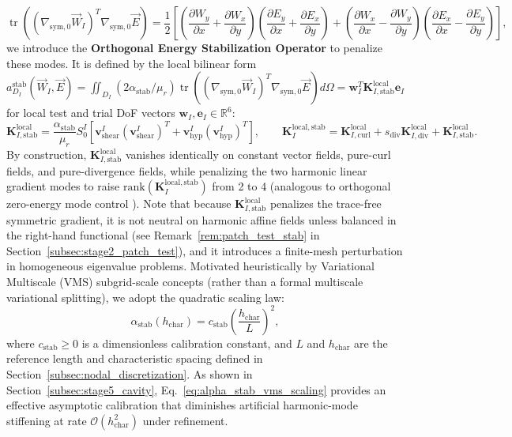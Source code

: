 \documentclass[VANCOUVER,Times1COL]{WileyNJD-v5}
\begin{document}
\begin{equation}
    \operatorname{tr}\!\left((\nabla_{\mathrm{sym},0}\vec{W}_I)^T \nabla_{\mathrm{sym},0}\vec{E}\right) = \frac{1}{2}\left[\left(\frac{\partial W_y}{\partial x} + \frac{\partial W_x}{\partial y}\right)\left(\frac{\partial E_y}{\partial x} + \frac{\partial E_x}{\partial y}\right) + \left(\frac{\partial W_x}{\partial x} - \frac{\partial W_y}{\partial y}\right)\left(\frac{\partial E_x}{\partial x} - \frac{\partial E_y}{\partial y}\right)\right],
    \label{eq:dev_trace_identity}
\end{equation}
we introduce the \textbf{Orthogonal Energy Stabilization Operator} to penalize these modes. It is defined by the local bilinear form $a_{D_I}^{\mathrm{stab}}(\vec{W}_I, \vec{E}) = \iint_{D_I} (2\alpha_{\mathrm{stab}}/\mu_r) \operatorname{tr}\!\left((\nabla_{\mathrm{sym},0}\vec{W}_I)^T \nabla_{\mathrm{sym},0}\vec{E}\right) d\Omega = \mathbf{w}_I^T \mathbf{K}_{I, \mathrm{stab}}^{\mathrm{local}} \mathbf{e}_I$ for local test and trial DoF vectors $\mathbf{w}_I, \mathbf{e}_I \in \mathbb{R}^6$:
\begin{equation}
    \mathbf{K}_{I, \mathrm{stab}}^{\mathrm{local}} = \frac{\alpha_{\mathrm{stab}}}{\mu_r} S_0^I \left[ \mathbf{v}_{\mathrm{shear}}^I (\mathbf{v}_{\mathrm{shear}}^I)^T + \mathbf{v}_{\mathrm{hyp}}^I (\mathbf{v}_{\mathrm{hyp}}^I)^T \right], \qquad
    \mathbf{K}_I^{\mathrm{local, stab}} = \mathbf{K}_{I, \mathrm{curl}}^{\mathrm{local}} + s_{\mathrm{div}}\mathbf{K}_{I, \mathrm{div}}^{\mathrm{local}} + \mathbf{K}_{I, \mathrm{stab}}^{\mathrm{local}}.
    \label{eq:k_stab_analytic}
\end{equation}
By construction, $\mathbf{K}_{I, \mathrm{stab}}^{\mathrm{local}}$ vanishes identically on constant vector fields, pure-curl fields, and pure-divergence fields, while penalizing the two harmonic linear gradient modes to raise $\mathrm{rank}(\mathbf{K}_I^{\mathrm{local, stab}})$ from 2 to 4 (analogous to orthogonal zero-energy mode control \cite{flanagan1981uniform}). Note that because $\mathbf{K}_{I, \mathrm{stab}}^{\mathrm{local}}$ penalizes the trace-free symmetric gradient, it is not neutral on harmonic affine fields unless balanced in the right-hand functional (see Remark~\ref{rem:patch_test_stab} in Section~\ref{subsec:stage2_patch_test}), and it introduces a finite-mesh perturbation in homogeneous eigenvalue problems. Motivated heuristically by Variational Multiscale (VMS) subgrid-scale concepts \cite{hughes1998variational, codina2000stabilization} (rather than a formal multiscale variational splitting), we adopt the quadratic scaling law:
\begin{equation}
    \alpha_{\mathrm{stab}}(h_{\mathrm{char}}) = c_{\mathrm{stab}} \left(\frac{h_{\mathrm{char}}}{L}\right)^2,
    \label{eq:alpha_stab_vms_scaling}
\end{equation}
where $c_{\mathrm{stab}} \ge 0$ is a dimensionless calibration constant, and $L$ and $h_{\mathrm{char}}$ are the reference length and characteristic spacing defined in Section~\ref{subsec:nodal_discretization}. As shown in Section~\ref{subsec:stage5_cavity}, Eq.~\eqref{eq:alpha_stab_vms_scaling} provides an effective asymptotic calibration that diminishes artificial harmonic-mode stiffening at rate $\mathcal{O}(h_{\mathrm{char}}^2)$ under refinement.
\end{document}
